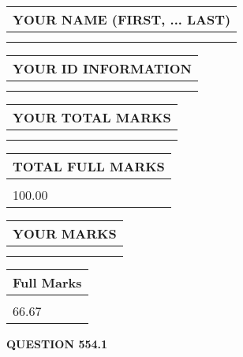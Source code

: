 \documentclass{ctexart}
\begin{document}
   
   
   
\newpage 
\setcounter{page}{ 
   554001 } 
   
   
   
   
\noindent\begin{tabular}{|l|}
\hline
YOUR NAME (FIRST, ... LAST)  \\
\hline
 \\ 
 \\ 
\hline
\end{tabular}
\hspace{0.05in} \begin{tabular}{|l|}
\hline
 YOUR   ID   INFORMATION  \\
\hline
 \\ 
 \\ 
\hline
\end{tabular}
   
   
\vspace{0.2in}\noindent\begin{tabular}{|l|}
\hline
YOUR TOTAL MARKS  \\
\hline
 \\ 
 \\ 
\hline
\end{tabular}
\hspace{0.05in} \begin{tabular}{|l|}
\hline
TOTAL FULL MARKS  \\
\hline
 \\ 
100.00 \\
\hline
\end{tabular}
   
   
 \vspace{0.2in}
 
 
 
 
   
   
  
\vspace{0.2in}
  
\noindent\begin{tabular}{|l|}
\hline
 YOUR MARKS  \\
\hline
 \\ 
 \\ 
\hline
\end{tabular}
\hspace{0.05in} \begin{tabular}{|l|}
\hline
 Full Marks  \\
\hline
 \\ 
66.67 \\
\hline
\end{tabular}
{\textbf{\Large{QUESTION
554.1 
}}}
  
\end{document}
